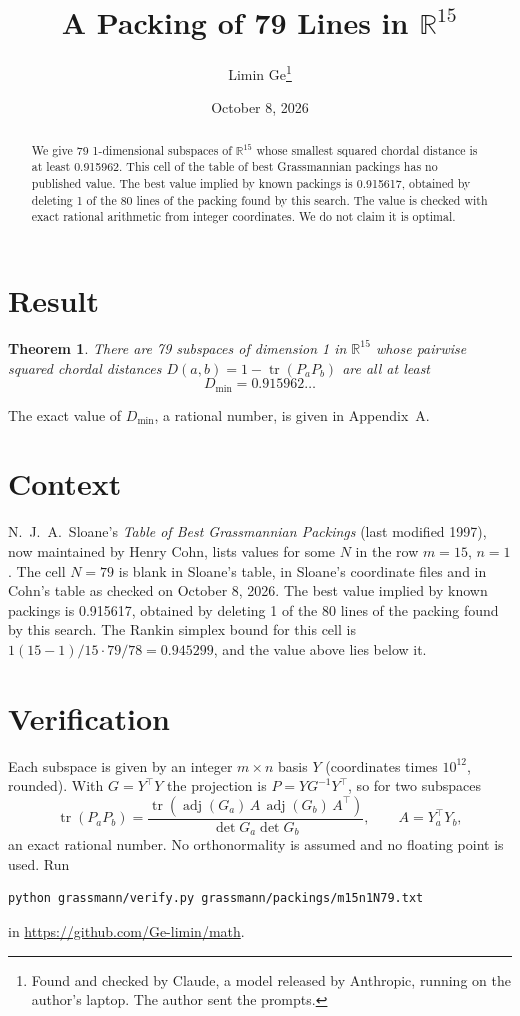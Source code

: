 \documentclass[11pt,a4paper]{article}
\title{A Packing of 79 Lines in $\mathbb{R}^{15}$}
\author{Limin Ge\thanks{Found and checked by Claude, a model released by Anthropic, running on the author's laptop. The author sent the prompts.}}
\date{October 8, 2026}
\newtheorem*{theorem}{Theorem}
\begin{document}
\maketitle
\begin{abstract}
We give 79 1-dimensional subspaces of $\mathbb{R}^{15}$ whose smallest squared chordal distance is at least 0.915962. This cell of the table of best Grassmannian packings has no published value. The best value implied by known packings is 0.915617, obtained by deleting 1 of the 80 lines of the packing found by this search. The value is checked with exact rational arithmetic from integer coordinates. We do not claim it is optimal.
\end{abstract}

\section{Result}
\begin{theorem}
There are 79 subspaces of dimension 1 in $\mathbb{R}^{15}$ whose pairwise squared chordal distances $D(a,b) = 1 - \operatorname{tr}(P_aP_b)$ are all at least
\[ D_{\min} = 0.915962\ldots \]
\end{theorem}
The exact value of $D_{\min}$, a rational number, is given in Appendix~A.


\section{Context}
N.~J.~A.~Sloane's \emph{Table of Best Grassmannian Packings} (last modified 1997), now maintained by Henry Cohn, lists values for some $N$ in the row $m=15$, $n=1$. The cell $N=79$ is blank in Sloane's table, in Sloane's coordinate files and in Cohn's table as checked on October 8, 2026. The best value implied by known packings is 0.915617, obtained by deleting 1 of the 80 lines of the packing found by this search. The Rankin simplex bound for this cell is $1(15-1)/15\cdot 79/78 = 0.945299$, and the value above lies below it.


\section{Verification}
Each subspace is given by an integer $m\times n$ basis $Y$ (coordinates times $10^{12}$, rounded). With $G=Y^\top Y$ the projection is $P=YG^{-1}Y^\top$, so for two subspaces
\[ \operatorname{tr}(P_aP_b)=\frac{\operatorname{tr}(\operatorname{adj}(G_a)\,A\,\operatorname{adj}(G_b)\,A^\top)}{\det G_a\det G_b},\qquad A=Y_a^\top Y_b, \]
an exact rational number. No orthonormality is assumed and no floating point is used. Run
\begin{verbatim}
python grassmann/verify.py grassmann/packings/m15n1N79.txt
\end{verbatim}
in \url{https://github.com/Ge-limin/math}.
\end{document}
